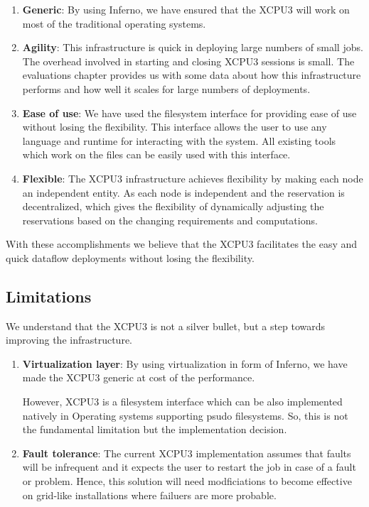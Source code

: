 \documentclass[conference]{IEEEtran}
\begin{document}
\begin{enumerate}
\item \textbf{Generic}: By using Inferno, we have ensured that the XCPU3 will
work on most of the traditional operating systems. 

\item \textbf{Agility}: This infrastructure is quick in deploying large numbers
of small jobs. The overhead involved in starting and closing XCPU3 sessions
is small. The evaluations chapter provides us with some data about how this
infrastructure performs and how well it scales for large numbers of deployments.

\item \textbf{Ease of use}:  We have used the filesystem interface for providing
ease of use without losing the flexibility.  This interface allows the user to
use any language and runtime for interacting with the system. All existing tools
which work on the files can be easily used with this interface.

\item \textbf{Flexible}: The XCPU3 infrastructure achieves flexibility by making
each node an independent entity.  As each node is independent and the
reservation is decentralized, which gives the flexibility of
dynamically adjusting the reservations based on the changing requirements and
computations. 
\end{enumerate}

With these accomplishments we believe that the XCPU3 facilitates the easy and
quick dataflow deployments without losing the flexibility.

\subsection{Limitations}
We understand that the XCPU3 is not a silver bullet, but a step towards
improving the infrastructure.

\begin{enumerate}
\item \textbf{Virtualization layer}: By using virtualization in form of
Inferno,  we have made the XCPU3 generic at cost of the performance.

However, XCPU3 is a filesystem interface which can be also implemented natively
in Operating systems supporting psudo filesystems.  So, this is not the
fundamental limitation but the implementation decision.

\item \textbf{Fault tolerance}:  The current XCPU3 implementation assumes that
faults will be infrequent and it expects the user to restart the job in case of
a fault or problem.  Hence, this solution will need modficiations to become  
effective on grid-like installations where failuers are more probable.
\end{enumerate}
\end{document}
